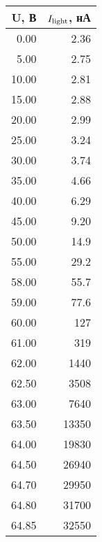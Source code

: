 \begin{tabular}{rr}
\toprule
    U, В &        $I_{\textnormal{light}}$,  нА\\
\midrule
 0.00 &     2.36 \\
 5.00 &     2.75 \\
10.00 &     2.81 \\
15.00 &     2.88 \\
20.00 &     2.99 \\
25.00 &     3.24 \\
30.00 &     3.74 \\
35.00 &     4.66 \\
40.00 &     6.29 \\
45.00 &     9.20 \\
50.00 &     14.9 \\
55.00 &     29.2 \\
58.00 &     55.7 \\
59.00 &     77.6 \\
60.00 &      127 \\
61.00 &      319 \\
62.00 &     1440 \\
62.50 &     3508 \\
63.00 &     7640 \\
63.50 &    13350 \\
64.00 &    19830 \\
64.50 &    26940 \\
64.70 &    29950 \\
64.80 &    31700 \\
64.85 &    32550 \\
\bottomrule
\end{tabular}